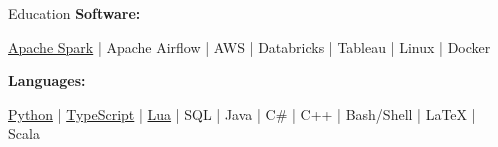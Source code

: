 \documentclass{resume/resume}
\begin{document}
\begin{rSection}{Education}
%
%
%
\vspace{-3pt}
{\bf Software:}
\vspace{-1.83em}
\begin{adjustwidth}{6em}{0pt}
  \href{https://databricks.com/blog/2022/07/14/using-spark-structured-streaming-to-scale-your-analytics.html}{Apache Spark} | 
  Apache Airflow |
  AWS | 
  Databricks | 
  Tableau | 
  Linux |
  Docker

\end{adjustwidth}

\end{rSection}

%
%   
%
%
%
\vspace{-0.4em}
{\bf Languages:}
\vspace{-1.83em}
\begin{adjustwidth}{6em}{0pt}
  \href{https://github.com/search?q=user\%3ASpelkington+user\%3AUtahTriangle+extension\%3Apy+extension\%3Aipynb&type=Code&ref=advsearch&l=&l=}{Python} |
  \href{https://github.com/search?p=1&q=user\%3ASpelkington+extension\%3Ats+extension\%3Atsx&type=Code}{TypeScript} | 
  \href{https://github.com/search?q=user\%3ASpelkington+extension\%3Alua&type=Code}{Lua} | 
  SQL |
  Java |
  C\# |
  C++ |
  Bash/Shell |
  LaTeX |
  Scala
\end{adjustwidth}
\end{document}
